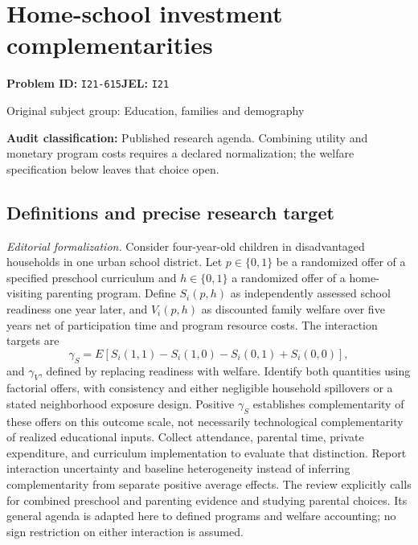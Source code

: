 \documentclass[11pt,a4paper]{article}
\begin{document}
\section*{Home-school investment complementarities}
\textbf{Problem ID:} \texttt{I21-615}\quad \textbf{JEL:} \texttt{I21}\par
\label{problem:OP-0451}
{\sffamily\small\color{muted}Original subject group: Education, families and demography\par}
\label{definitions:problem:30007733}
\textbf{Audit classification:} Published research agenda. Combining utility and monetary program costs requires a declared normalization; the welfare specification below leaves that choice open.
\subsection*{Definitions and precise research target}
\textit{Editorial formalization.} Consider four-year-old children in disadvantaged households in one urban school district. Let \(p\in\{0,1\}\) be a randomized offer of a specified preschool curriculum and \(h\in\{0,1\}\) a randomized offer of a home-visiting parenting program. Define \(S_i(p,h)\) as independently assessed school readiness one year later, and \(V_i(p,h)\) as discounted family welfare over five years net of participation time and program resource costs. The interaction targets are
\[\gamma_S=E[S_i(1,1)-S_i(1,0)-S_i(0,1)+S_i(0,0)],\]
and \(\gamma_V\), defined by replacing readiness with welfare. Identify both quantities using factorial offers, with consistency and either negligible household spillovers or a stated neighborhood exposure design. Positive \(\gamma_S\) establishes complementarity of these offers on this outcome scale, not necessarily technological complementarity of realized educational inputs. Collect attendance, parental time, private expenditure, and curriculum implementation to evaluate that distinction. Report interaction uncertainty and baseline heterogeneity instead of inferring complementarity from separate positive average effects. The review explicitly calls for combined preschool and parenting evidence and studying parental choices. Its general agenda is adapted here to defined programs and welfare accounting; no sign restriction on either interaction is assumed.
\end{document}
